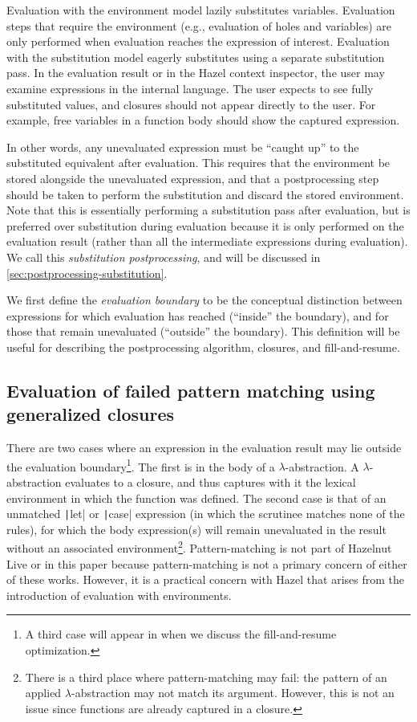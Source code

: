 Evaluation with the environment model lazily substitutes variables. Evaluation steps that require the environment (e.g., evaluation of holes and variables) are only performed when evaluation reaches the expression of interest. Evaluation with the substitution model eagerly substitutes using a separate substitution pass. In the evaluation result or in the Hazel context inspector, the user may examine expressions in the internal language. The user expects to see fully substituted values, and closures should not appear directly to the user. For example, free variables in a function body should show the captured expression.

In other words, any unevaluated expression must be ``caught up'' to the substituted equivalent after evaluation. This requires that the environment be stored alongside the unevaluated expression, and that a postprocessing step should be taken to perform the substitution and discard the stored environment. Note that this is essentially performing a substitution pass after evaluation, but is preferred over substitution during evaluation because it is only performed on the evaluation result (rather than all the intermediate expressions during evaluation). We call this \textit{substitution postprocessing}, and will be discussed in \cref{sec:postprocessing-substitution}.

We first define the \textit{evaluation boundary} to be the conceptual distinction between expressions for which evaluation has reached (``inside'' the boundary), and for those that remain unevaluated (``outside'' the boundary). This definition will be useful for describing the postprocessing algorithm, closures, and fill-and-resume.

\subsection{Evaluation of failed pattern matching using generalized closures}
\label{sec:failed_pattern_match}

There are two cases where an expression in the evaluation result may lie outside the evaluation boundary\footnote{A third case will appear in  when we discuss the fill-and-resume optimization.}. The first is in the body of a $\lambda$-abstraction. A $\lambda$-abstraction evaluates to a closure, and thus captures with it the lexical environment in which the function was defined. The second case is that of an unmatched \texttt|let| or \texttt|case| expression (in which the scrutinee matches none of the rules), for which the body expression(s) will remain unevaluated in the result without an associated environment\footnote{There is a third place where pattern-matching may fail: the pattern of an applied $\lambda$-abstraction may not match its argument. However, this is not an issue since functions are already captured in a closure.}. Pattern-matching is not part of Hazelnut Live or in this paper because pattern-matching is not a primary concern of either of these works. However, it is a practical concern with Hazel that arises from the introduction of evaluation with environments.

